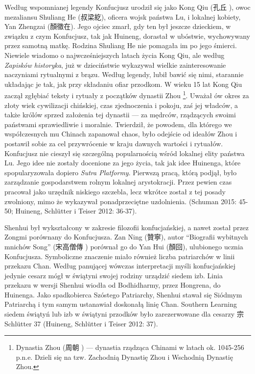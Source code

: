 Według wspomnianej legendy Konfucjusz urodził się jako Kong Qiu (孔丘 ), owoc mezaliansu Shuliang He (叔梁紇), oficera wojsk państwa Lu, i lokalnej kobiety, Yan Zhengzai (顏徵在). Jego ojciec zmarł, gdy ten był jeszcze dzieckiem, w związku z czym Konfucjusz, tak jak Huineng, dorastał w ubóstwie, wychowywany przez samotną matkę. Rodzina Shuliang He nie pomagała im po jego śmierci. Niewiele wiadomo o najwcześniejszych latach życia Kong Qiu, ale według \textit{Zapisków historyka}, już w dzieciństwie wykazywał wielkie zainteresowanie naczyniami rytualnymi z brązu. Według legendy, lubił bawić się nimi, starannie układając je tak, jak przy składaniu ofiar przodkom. W wieku 15 lat Kong Qiu zaczął zgłębiać teksty i rytuały z początków dynastii Zhou%
\footnote{Dynastia Zhou (周朝 ) --- dynastia rządząca Chinami w latach ok. 1045-256 p.n.e. Dzieli się na tzw. Zachodnią Dynastię Zhou i Wschodnią Dynastię Zhou.}.
Uważał ów okres za złoty wiek cywilizacji chińskiej, czas zjednoczenia i pokoju, zaś jej władców, a także królów sprzed założenia tej dynastii --- za mędrców, rządzących swoimi państwami sprawiedliwie i moralnie.
Twierdził, że powodem, dla którego we współczesnych mu Chinach zapanował chaos, było odejście od ideałów Zhou i postawił sobie za cel przywrócenie w kraju dawnych wartości i rytuałów.
Konfucjusz nie cieszył się szczególną popularnością wśród lokalnej elity państwa Lu.
Jego idee nie zostały docenione za jego życia, tak jak idee Huinenga, które spopularyzowała dopiero \textit{Sutra Platformy}.
Pierwszą pracą, którą podjął, było zarządzanie gospodarstwem rolnym lokalnej arystokracji.
Przez pewien czas pracował jako urzędnik niskiego szczebla, lecz wkrótce został z tej posady zwolniony, mimo że wykazywał ponadprzeciętne uzdolnienia.
(Schuman 2015: 45-50; Huineng, Schlütter i Teiser 2012: 36-37).

Shenhui był wykształcony w zakresie filozofii konfucjańskiej, a nawet został przez Zongmi porównany do Konfucjusza. Zan Ning (贊寧), autor ``Biografii wybitnych mnichów Song'' (宋高僧傳 ) porównał go do Yan Hui (顏回), ulubionego ucznia Konfucjusza.
Symboliczne znaczenie miało również liczba patriarchów w linii przekazu Chan. Według panującej wówczas interpretacji myśli konfucjańskiej jedynie cesarz mógł w świątyni swojej rodziny urządzić siedem izb. Linia przekazu w wersji Shenhui wiodła od Bodhidharmy, przez Hongrena, do Huinenga. Jako spadkobierca Szóstego Patriarchy, Shenhui stawał się Siódmym Patriarchą i tym samym ustanawiał doskonałą linię Chan.
Southern Learning
siedem świątyń lub izb w świątyni przodków było zarezerwowane dla cesarzy
宗
Schlütter 37 \fi
(Huineng, Schlütter i Teiser 2012: 37).

